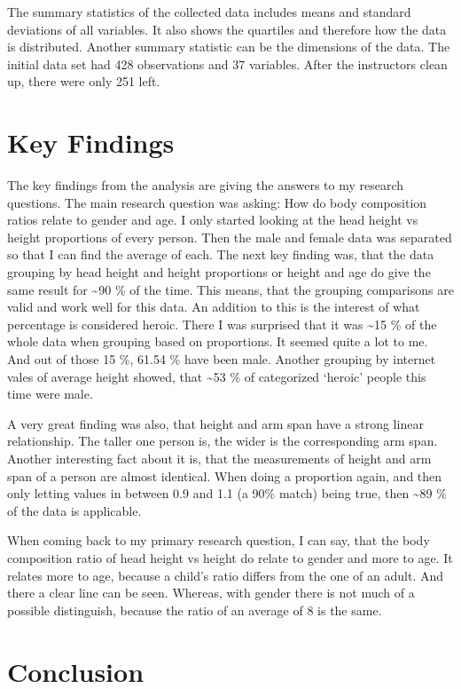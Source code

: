 \documentclass[]{article}
\begin{document}
The summary statistics of the collected data includes means and standard
deviations of all variables. It also shows the quartiles and therefore
how the data is distributed. Another summary statistic can be the
dimensions of the data. The initial data set had 428 observations and 37
variables. After the instructors clean up, there were only 251 left.

\section{Key Findings}
\label{sec:findings}

The key findings from the analysis are giving the answers to my research
questions. The main research question was asking: How do body
composition ratios relate to gender and age. I only started looking at
the head height vs height proportions of every person. Then the male and
female data was separated so that I can find the average of each. The
next key finding was, that the data grouping by head height and height
proportions or height and age do give the same result for
\textasciitilde90 \% of the time. This means, that the grouping
comparisons are valid and work well for this data. An addition to this
is the interest of what percentage is considered heroic. There I was
surprised that it was \textasciitilde15 \% of the whole data when
grouping based on proportions. It seemed quite a lot to me. And out of
those 15 \%, 61.54 \% have been male. Another grouping by internet vales
of average height showed, that \textasciitilde53 \% of categorized
`heroic' people this time were male.

A very great finding was also, that height and arm span have a strong
linear relationship. The taller one person is, the wider is the
corresponding arm span. Another interesting fact about it is, that the
measurements of height and arm span of a person are almost identical.
When doing a proportion again, and then only letting values in between
0.9 and 1.1 (a 90\% match) being true, then \textasciitilde89 \% of the
data is applicable.

When coming back to my primary research question, I can say, that the
body composition ratio of head height vs height do relate to gender and
more to age. It relates more to age, because a child's ratio differs
from the one of an adult. And there a clear line can be seen. Whereas,
with gender there is not much of a possible distinguish, because the
ratio of an average of 8 is the same.

\section{Conclusion}
\label{sec:conclusion}
\end{document}
